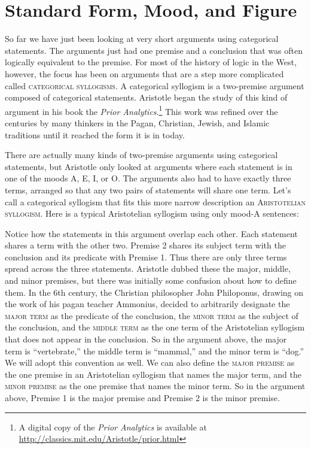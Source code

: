 \section{Standard Form, Mood, and Figure}\label{sec:form_mood_figure}

So far we have just been looking at very short arguments using categorical statements. The arguments just had one premise and a conclusion that was often logically equivalent to the premise. For most of the history of logic in the West, however, the focus has been on arguments that are a step more complicated called \textsc{\glspl{categorical syllogism}}. A categorical syllogism is a two-premise argument composed of categorical statements. Aristotle began the study of this kind of argument in his book the \textit{Prior Analytics}.\footnote{A digital copy of the \textit{Prior Analytics} is available at \url{http://classics.mit.edu/Aristotle/prior.html}} This work was refined over the centuries by many thinkers in the Pagan, Christian, Jewish, and Islamic traditions until it reached the form it is in today.

There are actually many kinds of two-premise arguments using categorical statements, but Aristotle only looked at arguments where each statement is in one of the moods A, E, I, or O. The arguments also had to have exactly three terms, arranged so that any two pairs of statements will share one term. Let's call a categorical syllogism that fits this more narrow description an \textsc{\gls{Aristotelian syllogism}}. Here is a typical Aristotelian syllogism using only mood-A sentences:

\begin{kormanize}
\end{kormanize}
\label{AAA_arg}

Notice how the statements in this argument overlap each other. Each statement shares a term with the other two. Premise 2 shares its subject term with the conclusion and its predicate with Premise 1. Thus there are only three terms spread across the three statements. Aristotle dubbed these the major, middle, and minor premises, but there was initially some confusion about how to define them. In the 6th century, the Christian philosopher John Philoponus, drawing on the work of his pagan teacher Ammonius, decided to arbitrarily designate the \textsc{\gls{major term}} as the predicate of the conclusion, the \textsc{\gls{minor term}} as the subject of the conclusion, and the \textsc{\gls{middle term}} as the one term of the Aristotelian syllogism that does not appear in the conclusion. So in the argument above, the major term is ``vertebrate,'' the middle term is ``mammal,'' and the minor term is ``dog.'' We will adopt this convention as well.
We can also define the \textsc{\gls{major premise}} as the one premise in an Aristotelian syllogism that names the major term, and the \textsc{\gls{minor premise}} as the one premise that names the minor term. So in the argument above, Premise 1 is the major premise and Premise 2 is the minor premise.


